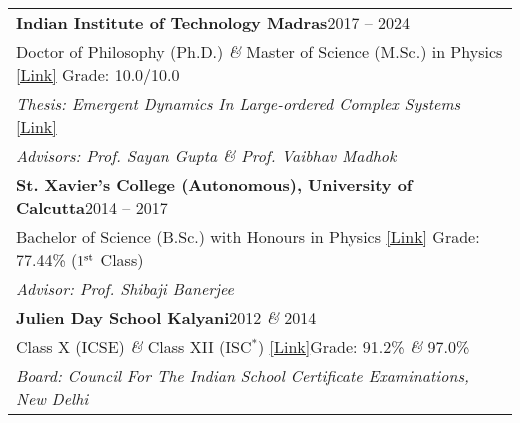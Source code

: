 
\noindent
\begin{tabular}{@{} m{18.5cm}}
\textbf{Indian Institute of Technology Madras}\hfill 2017 -- 2024\\
Doctor of Philosophy (Ph.D.) \textit{\&} Master of Science (M.Sc.) in Physics \href{https://drive.google.com/file/d/1e_EdV3adnDxSkRCMAQGF4_j8DAEQHmok/view?usp=sharing}{[Link]} \hfill Grade: 10.0/10.0\\
\textit{Thesis: Emergent Dynamics In Large-ordered Complex Systems} \href{http://hdl.handle.net/10603/609844}{[Link]}\\
\textit{Advisors: Prof. Sayan Gupta \& Prof. Vaibhav Madhok}\\[0.3cm]

\textbf{St. Xavier's College (Autonomous), University of Calcutta}\hfill 2014 -- 2017\\
Bachelor of Science (B.Sc.) with Honours in Physics \href{https://drive.google.com/file/d/1kzH1EiCFbbcnvpbOTWJMMhiCC53tkvDD/view?usp=sharing}{[Link]} \hfill Grade: 77.44\% ($1^{\rm st}$ Class)\\
\textit{Advisor: Prof. Shibaji Banerjee}\\[0.3cm]

\textbf{Julien Day School Kalyani}\hfill 2012 \textit{\&} 2014\\
Class X (ICSE) \textit{\&} Class XII (ISC$^{*}$) \href{https://drive.google.com/file/d/1rBzB5cY0d9NKxEajnIj6dx8uzIBc41sh/view?usp=sharing}{[Link]}\hfill Grade: 91.2\% \textit{\&} 97.0\%\\
\textit{Board: Council For The Indian School Certificate Examinations, New Delhi}
\end{tabular}